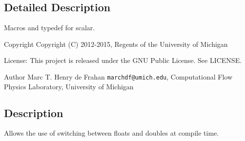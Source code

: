 \subsection{Detailed Description}
Macros and typedef for scalar. \begin{DoxyCopyright}{Copyright}
Copyright (C) 2012-\/2015, Regents of the University of Michigan 
\end{DoxyCopyright}
\begin{DoxyParagraph}{License\-:}
This project is released under the G\-N\-U Public License. See L\-I\-C\-E\-N\-S\-E. 
\end{DoxyParagraph}
\begin{DoxyAuthor}{Author}
Marc T. Henry de Frahan {\tt marchdf@umich.\-edu}, Computational Flow Physics Laboratory, University of Michigan 
\end{DoxyAuthor}
\subsection{Description}\label{scalar__def_8h_Description}
Allows the use of switching between floats and doubles at compile time. 
